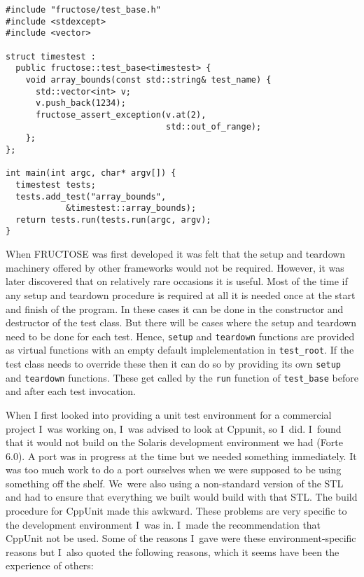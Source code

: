 \documentclass{book}
\begin{document}
\begin{verbatim}
#include "fructose/test_base.h"
#include <stdexcept>
#include <vector>

struct timestest : 
  public fructose::test_base<timestest> {
    void array_bounds(const std::string& test_name) {
      std::vector<int> v;
      v.push_back(1234);
      fructose_assert_exception(v.at(2), 
                                std::out_of_range);
    };
};

int main(int argc, char* argv[]) {
  timestest tests;
  tests.add_test("array_bounds", 
            &timestest::array_bounds);
  return tests.run(tests.run(argc, argv);
}
\end{verbatim}


When FRUCTOSE was first developed it was felt that the setup and teardown
machinery offered by other frameworks would not be required.
However, it was later discovered that on relatively rare
occasions it is useful. Most of the time if any setup and teardown procedure
is required at all it is needed once at the start and finish of
the program. In these cases it can be done in the constructor and
destructor of the test class. But there will be cases where the setup
and teardown need to be done for each test.
Hence, {\tt setup} and {\tt teardown} functions are provided as virtual
functions with an empty default implelementation in {\tt test\_root}.
If the test class needs to override these then it can do so by providing
its own {\tt setup} and {\tt teardown} functions.
These get called by the {\tt run} function of {\tt test\_base} before
and after each test invocation.



When I first looked into providing a unit test environment
for a commercial project I~was working on, I~was advised
to look at Cppunit, so I~did.
I~found that it would not build on the Solaris development
environment we had (Forte 6.0). A port was in progress at
the time but we needed something immediately.
It was too much work to do a port ourselves when we were
supposed to be using something off the shelf.
We~were also using a non-standard version of the STL
and had to ensure that everything we built would build with
that STL. The build procedure for CppUnit made this awkward.
These problems are very specific to the development environment
I~was in. I~made the recommendation that CppUnit not be used.
Some of the reasons I~gave were these environment-specific reasons
but I~also quoted the following reasons, which it seems have been
the experience of others:
\end{document}
